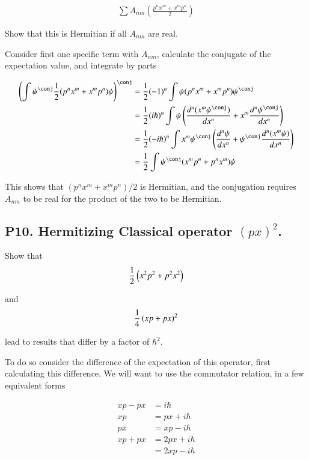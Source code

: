 \documentclass{article}
\begin{document}
\begin{align*}
\sum A_{nm} \left(\frac{p^n x^m + x^m p^n}{2}\right) 
\end{align*}

Show that this is Hermitian if all $A_{nm}$ are real.

Consider first one specific term with $A_{nm}$, calculate the conjugate of the expectation value, and integrate
by parts

\begin{align*}
\left(
\int \psi^\conj \inv{2}(p^n x^m + x^m p^n) \psi
\right)^\conj
&=
\inv{2} (-1)^n
\int \psi (p^n x^m + x^m p^n) \psi^\conj \\
&=
\inv{2} (i\hbar)^n 
\int \psi \left(\frac{d^n (x^m \psi^\conj)}{dx^n} + x^m \frac{d^n \psi^\conj}{dx^n} \right) \\
&=
\inv{2} (-i\hbar)^n 
\int x^m \psi^\conj \left(\frac{d^n \psi }{dx^n} + \psi^\conj \frac{d^n (x^m \psi)}{dx^n} \right) \\
&=
\inv{2}
\int \psi^\conj ( x^m p^n + p^n x^m ) \psi
\end{align*}

This shows that $(p^n x^m + x^m p^n)/2$ is Hermitian, and the conjugation requires $A_{nm}$ to be real for the
product of the two to be Hermitian.

\subsection{P10. Hermitizing Classical operator $(px)^2$. }

Show that 
\begin{align*}
\frac{1}{2}\left(x^2 p^2 + p^2 x^2 \right)
\end{align*}

and 
\begin{align*}
\frac{1}{4}\left(x p + p x \right)^2
\end{align*}

lead to results that differ by a factor of $\hbar^2$.

To do so consider the difference of the expectation of this operator, first calculating this difference.  We will
want to use the commutator relation, in a few equivalent forms

\begin{align*}
xp - p x &= i \hbar \\
xp &= p x + i \hbar \\
px &= x p - i \hbar \\
x p + p x &= 2 p x + i \hbar \\
          &= 2 x p - i \hbar \\
\end{align*}
\end{document}
